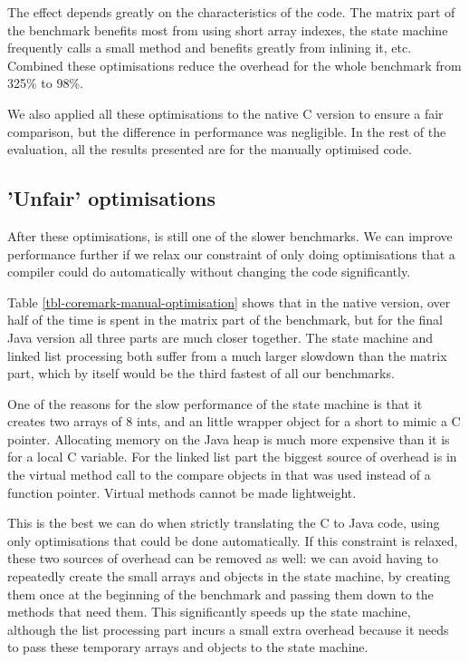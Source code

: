 The effect depends greatly on the characteristics of the code. The matrix part of the benchmark benefits most from using short array indexes, the state machine frequently calls a small method and benefits greatly from inlining it, etc. Combined these optimisations reduce the overhead for the whole benchmark from 325\% to 98\%.

We also applied all these optimisations to the native C version to ensure a fair comparison, but the difference in performance was negligible. In the rest of the evaluation, all the results presented are for the manually optimised code.

\subsection{'Unfair' optimisations}
\label{sec-evaluation-coremark-unfair-optimisations}
After these optimisations,  is still one of the slower benchmarks. We can improve performance further if we relax our constraint of only doing optimisations that a compiler could do automatically without changing the code significantly.

Table \ref{tbl-coremark-manual-optimisation} shows that in the native version, over half of the time is spent in the matrix part of the benchmark, but for the final Java version all three parts are much closer together. The state machine and linked list processing both suffer from a much larger slowdown than the matrix part, which by itself would be the third fastest of all our benchmarks.

One of the reasons for the slow performance of the state machine is that it creates two arrays of 8 ints, and an little wrapper object for a short to mimic a C pointer. Allocating memory on the Java heap is much more expensive than it is for a local C variable. For the linked list part the biggest source of overhead is in the virtual method call to the compare objects in  that was used instead of a function pointer. Virtual methods cannot be made lightweight.

This is the best we can do when strictly translating the C to Java code, using only optimisations that could be done automatically. If this constraint is relaxed, these two sources of overhead can be removed as well: we can avoid having to repeatedly create the small arrays and objects in the state machine, by creating them once at the beginning of the benchmark and passing them down to the methods that need them. This significantly speeds up the state machine, although the list processing part incurs a small extra overhead because it needs to pass these temporary arrays and objects to the state machine.

